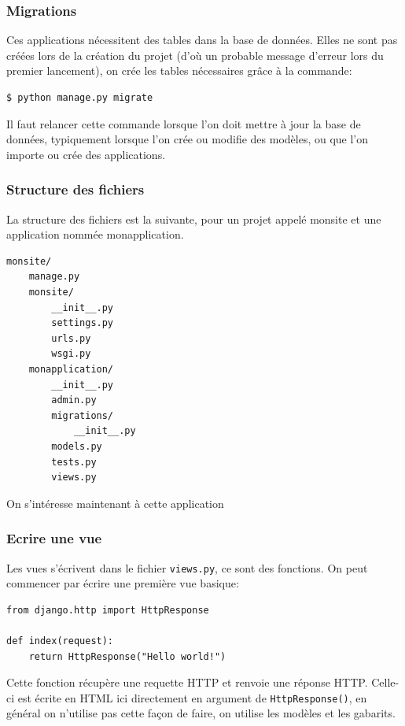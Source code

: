 \documentclass[a4paper, 10pt]{article}
\begin{document}
\subsubsection{Migrations}

Ces applications nécessitent des tables dans la base de données. Elles ne sont pas créées lors de la création du projet (d'où un probable message d'erreur lors du premier lancement), on crée les tables nécessaires grâce à la commande:
\begin{verbatim}
$ python manage.py migrate
\end{verbatim}

Il faut relancer cette commande lorsque l'on doit mettre à jour la base de données, typiquement lorsque l'on crée ou modifie des modèles, ou que l'on importe ou crée des applications.

\subsubsection{Structure des fichiers}
La structure des fichiers est la suivante, pour un projet appelé monsite et une application nommée monapplication.

\begin{verbatim}
monsite/
    manage.py
    monsite/
        __init__.py
        settings.py
        urls.py
        wsgi.py
    monapplication/
        __init__.py
        admin.py
        migrations/
            __init__.py
        models.py
        tests.py
        views.py
\end{verbatim}

On s'intéresse maintenant à cette application

\subsubsection{Ecrire une vue}
Les vues s'écrivent dans le fichier \texttt{views.py}, ce sont des fonctions. On peut commencer par écrire une première vue basique:

\begin{verbatim}
from django.http import HttpResponse

def index(request):
    return HttpResponse("Hello world!")
\end{verbatim}

Cette fonction récupère une requette HTTP et renvoie une réponse HTTP. Celle-ci est écrite en HTML ici directement en argument de \texttt{HttpResponse()}, en général on n'utilise pas cette façon de faire, on utilise les modèles et les gabarits.
\end{document}

